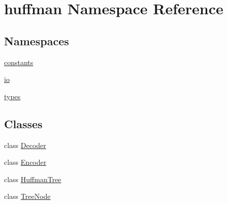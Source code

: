 \hypertarget{namespacehuffman}{}\section{huffman Namespace Reference}
\label{namespacehuffman}
\subsection*{Namespaces}
\begin{DoxyCompactItemize}
\item 
 \hyperlink{namespacehuffman_1_1constants}{constants}
\item 
 \hyperlink{namespacehuffman_1_1io}{io}
\item 
 \hyperlink{namespacehuffman_1_1types}{types}
\end{DoxyCompactItemize}
\subsection*{Classes}
\begin{DoxyCompactItemize}
\item 
class \hyperlink{classhuffman_1_1Decoder}{Decoder}
\item 
class \hyperlink{classhuffman_1_1Encoder}{Encoder}
\item 
class \hyperlink{classhuffman_1_1HuffmanTree}{Huffman\+Tree}
\item 
class \hyperlink{classhuffman_1_1TreeNode}{Tree\+Node}
\end{DoxyCompactItemize}
